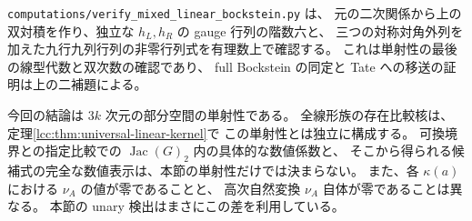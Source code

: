 \begin{remark}[計算証明書と残る比較]
\label{mix:rem:linear-bockstein-scope}
\texttt{computations/verify\_mixed\_linear\_bockstein.py} は、
元の二次関係から上の双対積を作り、独立な $h_L,h_R$ の gauge 行列の階数六と、
三つの対称対角外列を加えた九行九列行列の非零行列式を有理数上で確認する。
これは単射性の最後の線型代数と双次数の確認であり、
full Bockstein の同定と Tate への移送の証明は上の二補題による。

今回の結論は $3k$ 次元の部分空間の単射性である。
全線形族の存在比較核は、定理\ref{lcc:thm:universal-linear-kernel}で
この単射性とは独立に構成する。
可換境界との指定比較での $\operatorname{Jac}(G)_2$ 内の具体的な数値係数と、
そこから得られる候補式の完全な数値表示は、本節の単射性だけでは決まらない。
また、各 $\kappa(a)$ における $\nu_A$ の値が零であることと、
高次自然変換 $\nu_A$ 自体が零であることは異なる。
本節の unary 検出はまさにこの差を利用している。
\end{remark}
